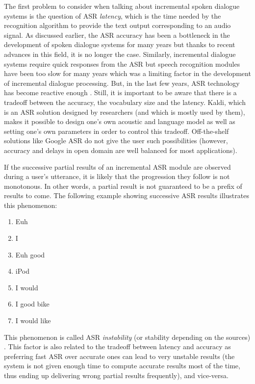 		The first problem to consider when talking about incremental spoken dialogue systems is the question of ASR \textit{latency}, which is the time needed by the recognition algorithm to provide the text output corresponding to an audio signal. As discussed earlier, the ASR accuracy has been a bottleneck in the development of spoken dialogue systems for many years but thanks to recent advances in this field, it is no longer the case. Similarly, incremental dialogue systems require quick responses from the ASR but speech recognition modules have been too slow for many years which was a limiting factor in the development of incremental dialogue processing. But, in the last few years, ASR technology has become reactive enough \cite{Breslin2013,Platek2014}. Still, it is important to be aware that there is a tradeoff between the accuracy, the vocabulary size and the latency. Kaldi, which is an ASR solution designed by researchers (and which is mostly used by them), makes it possible to design one's own acoustic and language model as well as setting one's own parameters in order to control this tradeoff. Off-the-shelf solutions like Google ASR do not give the user such possibilities (however, accuracy and delays in open domain are well balanced for most applications).

		If the successive partial results of an incremental ASR module are observed during a user's utterance, it is likely that the progression they follow is not monotonous. In other words, a partial result is not guaranteed to be a prefix of results to come. The following example showing successive ASR results illustrates this phenomenon:

		\begin{enumerate}
			\item Euh
			\item I
			\item Euh good
			\item iPod
			\item I would
			\item I good bike
			\item I would like
		\end{enumerate}

		This phenomenon is called ASR \textit{instability} (or stability depending on the sources) \cite{Selfridge2011}. This factor is also related to the tradeoff between latency and accuracy as preferring fast ASR over accurate ones can lead to very unstable results (the system is not given enough time to compute accurate results most of the time, thus ending up delivering wrong partial results frequently), and vice-versa.
		
